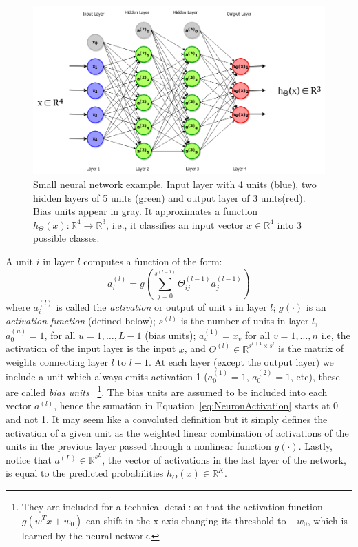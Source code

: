 \begin{figure}[h]
	\centering
	\includegraphics[width = \textwidth]{plots/neuralNetwork.png}
	\caption[Example of an Artificial Neural Network]{Small neural network example. Input layer with 4 units (blue), two hidden layers of 5 units (green) and output layer of 3 units(red). Bias units appear in gray. It approximates a function $h_\Theta(x): \mathbb{R}^4 \to \mathbb{R}^3$, i.e., it classifies an input vector $x \in \mathbb{R}^4$ into 3 possible classes.}
	\label{fig:NeuralNetwork}
\end{figure}

A unit $i$ in layer $l$ computes a function of the form:
\begin{equation}
	a^{(l)}_i = g \left(\sum_{j=0}^{s^{(l-1)}} \Theta^{(l-1)}_{ij}a_j^{(l-1)}\right)
	\label{eq:NeuronActivation}
\end{equation}
where $a^{(l)}_i$ is called the \emph{activation} or output of unit $i$ in layer $l$; $g(\cdot)$ is an \emph{activation function} (defined below); $s^{(l)}$ is the number of units in layer $l$, $a^{(u)}_0 = 1$, for all $u = 1, \ldots, L-1$ (bias units); $a^{(1)}_v = x_v$ for all $v = 1, \ldots, n$ i.e, the activation of the input layer is the input $x$, and $\Theta^{(l)} \in \mathbb{R}^{s^{l+1} \times s^{l}} $ is the matrix of weights connecting layer $l$ to $l+1$. At each layer (except the output layer) we include a unit which always emits activation 1 ($a^{(1)}_0 = 1$, $a^{(2)}_0 = 1$, etc), these are called \emph{bias units}~
\footnote{They are included for a technical detail: so that the activation function $g(w^Tx+w_0)$ can shift in the x-axis changing its threshold to $-w_0$, which is learned by the neural network.}.
The bias units are assumed to be included into each vector $a^{(l)}$, hence the sumation in Equation~\ref{eq:NeuronActivation} starts at 0 and not 1. It may seem like a convoluted definition but it simply defines the activation of a given unit as the weighted linear combination of activations of the units in the previous layer passed through a nonlinear function $g(\cdot)$. Lastly, notice that $a^{(L)} \in \mathbb{R}^{s^L}$, the vector of activations in the last layer of the network, is equal to the predicted probabilities $h_\Theta(x) \in \mathbb{R}^K$.


